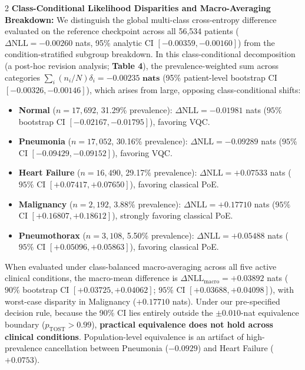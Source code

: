 \documentclass[10pt,a4paper,twoside]{article}
\begin{document}
\begin{multicols}{2}
\noindent\textbf{Class-Conditional Likelihood Disparities and Macro-Averaging Breakdown:} We distinguish the global multi-class cross-entropy difference evaluated on the reference checkpoint across all 56,534 patients ($\Delta\text{NLL} = -0.00260$ nats, 95\% analytic CI $[-0.00359, -0.00160]$) from the condition-stratified subgroup breakdown. In this class-conditional decomposition (a post-hoc revision analysis; \textbf{Table 4}), the prevalence-weighted sum across categories $\sum_i (n_i / N) \delta_i = \mathbf{-0.00235\text{ nats}}$ (95\% patient-level bootstrap CI $[-0.00326, -0.00146]$), which arises from large, opposing class-conditional shifts:
\begin{itemize}
  \item \textbf{Normal} ($n = 17,692$, 31.29\% prevalence): $\Delta\text{NLL} = \mathbf{-0.01981}$ nats ($95\%$ bootstrap CI $[-0.02167, -0.01795]$), favoring VQC.
  \item \textbf{Pneumonia} ($n = 17,052$, 30.16\% prevalence): $\Delta\text{NLL} = \mathbf{-0.09289}$ nats ($95\%$ CI $[-0.09429, -0.09152]$), favoring VQC.
  \item \textbf{Heart Failure} ($n = 16,490$, 29.17\% prevalence): $\Delta\text{NLL} = \mathbf{+0.07533}$ nats ($95\%$ CI $[+0.07417, +0.07650]$), favoring classical PoE.
  \item \textbf{Malignancy} ($n = 2,192$, 3.88\% prevalence): $\Delta\text{NLL} = \mathbf{+0.17710}$ nats ($95\%$ CI $[+0.16807, +0.18612]$), strongly favoring classical PoE.
  \item \textbf{Pneumothorax} ($n = 3,108$, 5.50\% prevalence): $\Delta\text{NLL} = \mathbf{+0.05488}$ nats ($95\%$ CI $[+0.05096, +0.05863]$), favoring classical PoE.
\end{itemize}
When evaluated under class-balanced macro-averaging across all five active clinical conditions, the macro-mean difference is $\Delta\text{NLL}_{\text{macro}} = \mathbf{+0.03892}$ nats ($90\%$ bootstrap CI $[+0.03725, +0.04062]$; $95\%$ CI $[+0.03688, +0.04098]$), with worst-case disparity in Malignancy ($+0.17710$ nats). Under our pre-specified decision rule, because the 90\% CI lies entirely outside the $\pm 0.010$-nat equivalence boundary ($p_{\text{TOST}} > 0.99$), \textbf{practical equivalence does not hold across clinical conditions}. Population-level equivalence is an artifact of high-prevalence cancellation between Pneumonia ($-0.0929$) and Heart Failure ($+0.0753$).


\end{multicols}
\end{document}
